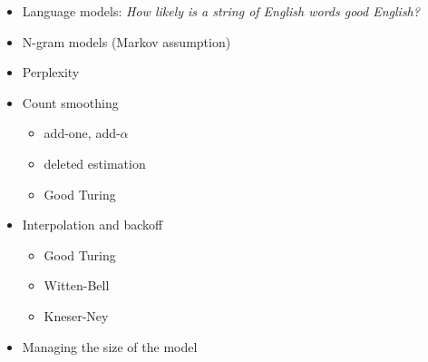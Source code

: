 \documentclass[landscape]{slides}
\begin{document}
\begin{itemize}
\item Language models: {\em How likely is a string of English words good English?}
\vspace{-3mm}
\item N-gram models (Markov assumption)
\vspace{-3mm}
\item Perplexity
\vspace{-3mm}
\item Count smoothing
\vspace{-3mm}
\begin{itemize}
\item add-one, add-$\alpha$
\item deleted estimation
\item Good Turing
\end{itemize}
\vspace{-3mm}
\item Interpolation and backoff
\vspace{-3mm}
\begin{itemize}
\item Good Turing
\item Witten-Bell
\item Kneser-Ney
\end{itemize}
\vspace{-3mm}
\item Managing the size of the model
\end{itemize}

\end{document}
